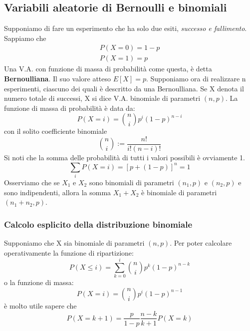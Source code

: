 \documentclass[11pt]{article}
\begin{document}
\subsection{Variabili aleatorie di Bernoulli e binomiali}
Supponiamo di fare un esperimento che ha solo due esiti, \textit{successo e fallimento}. Sappiamo che
\begin{gather*}
    P(X=0)=1-p\\ 
    P(X=1)=p
\end{gather*}
Una V.A. con funzione di massa di probabilità come questa, è detta \textbf{Bernoulliana}. Il suo valore atteso $E[X] = p$.
Supponiamo ora di realizzare n esperimenti, ciascuno dei quali è descritto da una Bernoulliana. Se X denota il numero totale di successi, X si dice V.A. binomiale di parametri $(n,p)$. La funzione di massa di probabilità è data da:
\begin{displaymath}
    P(X=i)={n \choose i} p^i(1-p)^{n-i}
\end{displaymath}
con il solito coefficiente binomiale
\begin{displaymath}
    {n \choose i} := \frac{n!}{i!(n-i)!}
\end{displaymath}
Si noti che la somma delle probabilità di tutti i valori possibili è ovviamente 1.
\begin{displaymath}
    \sum_iP(X=i)=[p+(1-p)]^n=1
\end{displaymath}
Osserviamo che se $X_1$ e $X_2$ sono binomiali di parametri $(n_1,p)$ e $(n_2,p)$ e sono indipendenti, allora la somma $X_1+X_2$ è binomiale di parametri $(n_1+n_2,p)$.
\subsubsection{Calcolo esplicito della distribuzione binomiale}
Supponiamo che X sia binomiale di parametri $(n,p)$. Per poter calcolare operativamente la funzione di ripartizione:
\begin{displaymath}
    P(X\le i) = \sum_{k=0}^i {n \choose i} p^k (1-p)^{n-k}
\end{displaymath}
o la funzione di massa:
\begin{displaymath}
    P(X=i) = {n \choose i} p^i(1-p)^{n-1}
\end{displaymath}
è molto utile sapere che 
\begin{displaymath}
    P(X=k+1)=\frac{p}{1-p}\frac{n-k}{k+1}P(X=k)
\end{displaymath}
\end{document}
